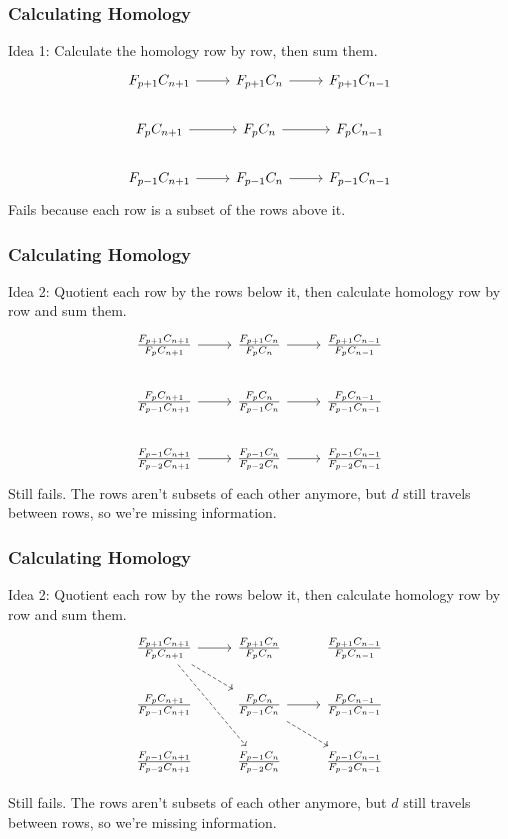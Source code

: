 \documentclass{beamer}
\begin{document}
\begin{frame}[fragile]
	\frametitle{Calculating Homology}

	Idea 1: Calculate the homology row by row, then sum them.
	\[
        \begin{tikzcd}
                F_{p+1}C_{n+1}\rar&F_{p+1}C_{n}\rar&F_{p+1}C_{n-1}\\
                F_{p}C_{n+1}\rar&F_{p}C_{n}\rar&F_{p}C_{n-1}\\
                F_{p-1}C_{n+1}\rar&F_{p-1}C_{n}\rar&F_{p-1}C_{n-1}
        \end{tikzcd}
        \]
	\onslide<2> Fails because each row is a subset of the rows above it.
\end{frame}

\begin{frame}[fragile]
	\frametitle{Calculating Homology}

	Idea 2: Quotient each row by the rows below it, then calculate homology row by row and sum them.
	\[
	\begin{tikzcd}
		\frac{F_{p+1}C_{n+1}}{F_{p}C_{n+1}}\rar&\frac{F_{p+1}C_{n}}{F_{p}C_{n}}\rar&\frac{F_{p+1}C_{n-1}}{F_{p}C_{n-1}}\\
		\frac{F_{p}C_{n+1}}{F_{p-1}C_{n+1}}\rar&\frac{F_{p}C_{n}}{F_{p-1}C_{n}}\rar&\frac{F_{p}C_{n-1}}{F_{p-1}C_{n-1}}\\
		\frac{F_{p-1}C_{n+1}}{F_{p-2}C_{n+1}}\rar&\frac{F_{p-1}C_{n}}{F_{p-2}C_{n}}\rar&\frac{F_{p-1}C_{n-1}}{F_{p-2}C_{n-1}}
        \end{tikzcd}
	\] 
	{\color{white}Still fails. The rows aren't subsets of each other anymore, but $d$ still travels between rows, so we're missing information.}
\end{frame}

\begin{frame}[fragile]
	\frametitle{Calculating Homology}

	Idea 2: Quotient each row by the rows below it, then calculate homology row by row and sum them.
	\[
		\begin{tikzcd}
			\frac{F_{p+1}C_{n+1}}{F_{p}C_{n+1}}\rar\arrow[rd,dashed]\arrow[rdd,dashed]&\frac{F_{p+1}C_{n}}{F_{p}C_{n}}&\frac{F_{p+1}C_{n-1}}{F_{p}C_{n-1}}\\
			\frac{F_{p}C_{n+1}}{F_{p-1}C_{n+1}}&\frac{F_{p}C_{n}}{F_{p-1}C_{n}}\rar\arrow[rd,dashed]&\frac{F_{p}C_{n-1}}{F_{p-1}C_{n-1}}\\
			\frac{F_{p-1}C_{n+1}}{F_{p-2}C_{n+1}}&\frac{F_{p-1}C_{n}}{F_{p-2}C_{n}}&\frac{F_{p-1}C_{n-1}}{F_{p-2}C_{n-1}}
		\end{tikzcd}
        \]

	Still fails. The rows aren't subsets of each other anymore, but $d$ still travels between rows, so we're missing information.
\end{frame}
\end{document}
